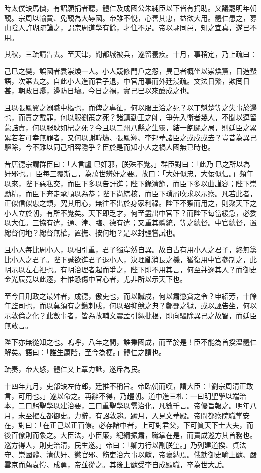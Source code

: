 \begin{pinyinscope}
時太僕缺馬價，有詔願捐者聽，體仁及成國公朱純臣以下皆有捐助。又議罷明年朝覲。宗周以輸貲、免覲為大辱國。帝雖不悅，心善其忠，益欲大用。體仁患之，募山陰人許瑚疏論之，謂宗周道學有餘，才住不足。帝以瑚同邑，知之宜真，遂已不用。

其秋，三疏請告去。至天津，聞都城被兵，遂留養疾。十月，事稍定，乃上疏曰：

己巳之變，誤國者袁崇煥一人。小人競修門戶之怨，異己者概坐以崇煥黨，日造蜚語，次第去之。自此小人進而君子退，中官用事而外廷浸疏。文法日繁，欺罔日甚，朝政日隳，邊防日壞。今日之禍，實己巳以來釀成之也。

且以張鳳翼之溺職中樞也，而俾之專征，何以服王洽之死？以丁魁楚等之失事於邊也，而責之戴罪，何以服劉策之死？諸鎮勤王之師，爭先入衛者幾人，不聞以逗留蒙詰責，何以服耿如杞之死？今且以二州八縣之生靈，結一飽颺之局，則廷臣之累累若若可幸無罪者，又何以謝韓爌、張鳳翔、李邦華諸臣之或戍或去？豈昔為異己驅除，今不難以同己相容隱乎？臣於是而知小人之禍人國無已時也。

昔唐德宗謂群臣曰：「人言盧巳奸邪，朕殊不覺。」群臣對曰：「此乃巳之所以為奸邪也。」臣每三覆斯言，為萬世辨奸之要。故曰：「大奸似忠，大佞似信。」頻年以來，陛下惡私交，而臣下多以告訐進；陛下錄清節，而臣下多以曲謹容；陛下崇勵精，而臣下奔走承順以為恭；陛下尚綜核，而臣下瑣屑吹求以示察。凡若此者，正似信似忠之類，究其用心，無往不出於身家利祿。陛下不察而用之，則聚天下之小人立於朝，有所不覺矣。天下即乏才，何至盡出中官下？而陛下每當緩急，必委以大任。三協有遣，通、津、臨、德有遣；又重其體統，等之總督。中官總督，置總督何地？總督無權，置撫、按何地？是以封疆嘗試也。

且小人每比周小人，以相引重，君子獨岸然自異。故自古有用小人之君子，終無黨比小人之君子。陛下誠欲進君子退小人，決理亂消長之機，猶復用中官參制之，此明示以左右袒也。有明治理者起而爭之，陛下即不用其言，何至并逐其人？而御史金光辰竟以此逐，若惟恐傷中官心者，尤非所以示天下也。

至今日刑政之最舛者，成德，傲吏也，而以贓戍，何以肅懲貪之令？申紹芳，十餘年監司也，而以莫須有之鑽刺戍，何以昭抑競之典？鄭鄤之獄，或以誣告坐，何以示敦倫之化？此數事者，皆為故輔文震孟引繩批根，即向驅除異己之故智，而廷臣無敢言。

陛下亦無從知之也。嗚呼，八年之間，誰秉國成，而至於是！臣不能為首揆溫體仁解矣。語曰：「誰生厲階，至今為梗。」體仁之謂也。

疏奏，帝大怒，體仁又上章力詆，遂斥為民。

十四年九月，吏部缺左侍郎，廷推不稱旨。帝臨朝而嘆，謂大臣：「劉宗周清正敢言，可用也。」遂以命之。再辭不得，乃趨朝。道中進三札：一曰明聖學以端治本，二曰躬聖學以建治要，三曰重聖學以需治化，凡數千言。帝優旨報之。明年八月，未至擢左都御史。力辭，有詔敦趨。踰月，入見文華殿。帝問都察院職掌安在，對曰：「在正己以正百僚。必存諸中者，上可對君父，下可質天下士大夫，而後百僚則而象之。大臣法，小臣廉，紀綱振肅，職掌在是，而責成巡方其首務也。巡方得人，則吏治清，民生遂。」帝曰：「卿力行以副朕望。」乃列建道揆、貞法守、崇國體、清伏奸、懲官邪、飭吏治六事以獻，帝褒納焉。俄劾御史喻上猷、嚴雲京而薦袁愷、成勇，帝並從之。其後上猷受李自成顯職，卒為世大詬。


\end{pinyinscope}
